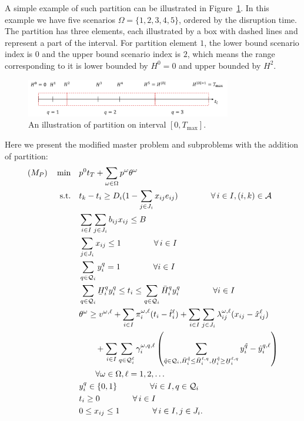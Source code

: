 \documentclass[11pt]{article}
\newcommand{\noi}{\noindent}
\renewcommand{\underbar}{\underaccent{\bar}}
\begin{document}
	\noi A simple example of such partition can be illustrated in Figure~\ref{fig:simplePart}. In this example we have five scenarios \(\Omega = \{1,2,3,4,5\}\), ordered by the disruption time. The partition has three elements, each illustrated by a box with dashed lines and represent a part of the interval. For partition element \(1\), the lower bound scenario index is \(0\) and the upper bound scenario index is \(2\), which means the range corresponding to it is lower bounded by \(H^0 = 0\) and upper bounded by \(H^2\).
	\begin{figure}[H]
		\centering
		\includegraphics[width=0.8\textwidth]{simplePart}
		\caption{An illustration of partition on interval \([0,T_{\max}]\).}
		\label{fig:simplePart}
	\end{figure}
	Here we present the modified master problem and subproblems with the addition of partition:
	\begin{subequations}
		\begin{align}
			(M_P) \quad \min \quad &p^0 t_T + \sum_{\omega \in \Omega} p^\omega \theta^{\omega}\\
			\text{s.t.} \quad & t_k - t_i \geq D_{i}(1 - \sum_{j \in J_i} x_{ij} e_{ij}) \qquad \qquad \forall \,i \in I, (i,k) \in \mathcal{A} \label{cons:MpSep}\\
			& \sum_{i \in I} \sum_{j \in J_i} b_{ij}x_{ij} \leq B  \label{cons:MpBudget}\\
			& \sum_{j \in J_i} x_{ij} \leq 1  \qquad \qquad \forall \,i \in I \label{cons:MpSingleBudget}\\
			& \sum_{q \in \mathcal{Q}_i} y^q_i = 1 \qquad \qquad \forall i \in I \\
			& \sum_{q \in \mathcal{Q}_i} \underbar{H}_i^{q} y_i^{q} \leq t_i \leq \sum_{q \in \mathcal{Q}_i} \bar{H}_i^{q} y_i^{q} \qquad \qquad \forall i \in I\\
			& \theta^\omega \geq v^{\omega,\ell} + \sum_{i \in I} \pi_i^{\omega,\ell} (t_i - \hat{t}_i^{\ell}) + \sum_{i \in I} \sum_{j \in J_i} \lambda_{ij}^{\omega,\ell} (x_{ij} - \hat{x}_{ij}^{\ell}) \nonumber \\
			&\qquad + \sum_{i \in I} \sum_{q \in \mathcal{Q}^{\ell}_i} \gamma_i^{\omega,q,\ell} \left( \sum_{\tilde{q} \in \mathcal{Q}_i, \bar{H}_i^{\tilde{q}} \leq \bar{H}_i^{\ell,q},\underbar{H}_i^{\tilde{q}} \geq \underbar{H}_i^{\ell,q} }y_i^{\tilde{q}} - \hat{y}_i^{q,\ell} \right) \nonumber \\
			& \qquad  \forall \omega \in \Omega, \ell = 1, 2, \dots\\
			& y_i^q \in \{0,1\} \qquad \qquad \forall i \in I, q \in \mathcal{Q}_i\\
			& t_i \geq 0 \qquad \qquad \forall \,i \in I\\
			& 0 \leq x_{ij} \leq 1 \qquad \qquad \forall \,i \in I, j \in J_i.
		\end{align}
	\end{subequations}
\end{document}
